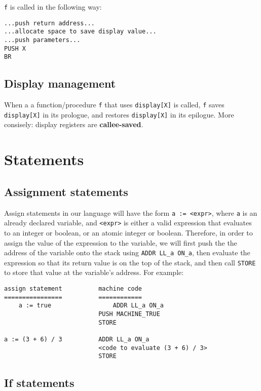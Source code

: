 \documentclass[11pt]{article}
\begin{document}
\texttt{f} is called in the following way:
\begin{verbatim}
...push return address...
...allocate space to save display value...
...push parameters...
PUSH X
BR
\end{verbatim}

\subsection{Display management}

When a a function/procedure \texttt{f} that uses \texttt{display[X]} is called, \texttt{f} saves \texttt{display[X]} in its prologue, and restores \texttt{display[X]} in its epilogue. More consisely: display registers are \textbf{callee-saved}.

\section{Statements}

\subsection{Assignment statements}

Assign statements in our language will have the form \texttt{a := <expr>}, where \texttt{a} is an already declared variable, and \texttt{<expr>} is either a valid expression that evaluates to an integer or boolean, or an atomic integer or boolean. Therefore, in order to assign the value of the expression to the variable, we will first push the the address of the variable onto the stack using \texttt{ADDR LL\_a ON\_a}, then evaluate the expression so that its return value is on the top of the stack, and then call \texttt{STORE} to store that value at the variable's address. For example:

\begin{verbatim}
assign statement          machine code
================          ============
	a := true                 ADDR LL_a ON_a
                          PUSH MACHINE_TRUE
                          STORE
                          
a := (3 + 6) / 3          ADDR LL_a ON_a
                          <code to evaluate (3 + 6) / 3>
                          STORE
\end{verbatim}

\subsection{If statements}
\end{document}
